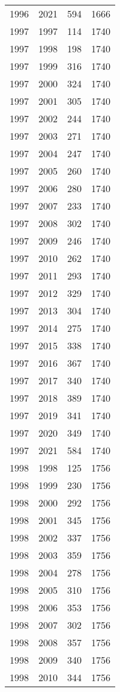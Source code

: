\documentclass[
  11pt,
  letterpaper,
  DIV=11,
  numbers=noendperiod,
  twoside]{scrartcl}
\begin{document}
\begin{longtable}[]{@{}rrrr@{}}
1996 & 2021 & 594 & 1666 \\
1997 & 1997 & 114 & 1740 \\
1997 & 1998 & 198 & 1740 \\
1997 & 1999 & 316 & 1740 \\
1997 & 2000 & 324 & 1740 \\
1997 & 2001 & 305 & 1740 \\
1997 & 2002 & 244 & 1740 \\
1997 & 2003 & 271 & 1740 \\
1997 & 2004 & 247 & 1740 \\
1997 & 2005 & 260 & 1740 \\
1997 & 2006 & 280 & 1740 \\
1997 & 2007 & 233 & 1740 \\
1997 & 2008 & 302 & 1740 \\
1997 & 2009 & 246 & 1740 \\
1997 & 2010 & 262 & 1740 \\
1997 & 2011 & 293 & 1740 \\
1997 & 2012 & 329 & 1740 \\
1997 & 2013 & 304 & 1740 \\
1997 & 2014 & 275 & 1740 \\
1997 & 2015 & 338 & 1740 \\
1997 & 2016 & 367 & 1740 \\
1997 & 2017 & 340 & 1740 \\
1997 & 2018 & 389 & 1740 \\
1997 & 2019 & 341 & 1740 \\
1997 & 2020 & 349 & 1740 \\
1997 & 2021 & 584 & 1740 \\
1998 & 1998 & 125 & 1756 \\
1998 & 1999 & 230 & 1756 \\
1998 & 2000 & 292 & 1756 \\
1998 & 2001 & 345 & 1756 \\
1998 & 2002 & 337 & 1756 \\
1998 & 2003 & 359 & 1756 \\
1998 & 2004 & 278 & 1756 \\
1998 & 2005 & 310 & 1756 \\
1998 & 2006 & 353 & 1756 \\
1998 & 2007 & 302 & 1756 \\
1998 & 2008 & 357 & 1756 \\
1998 & 2009 & 340 & 1756 \\
1998 & 2010 & 344 & 1756 \\

\end{longtable}
\end{document}
